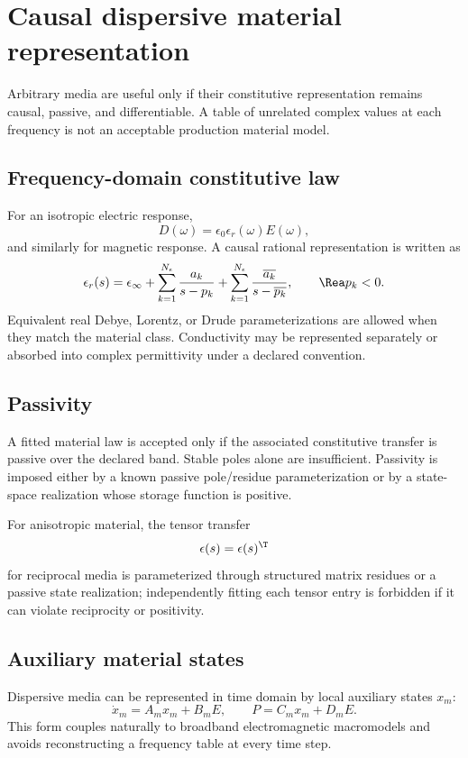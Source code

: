 \section{Causal dispersive material representation}
\label{sec:dispersive-materials}

Arbitrary media are useful only if their constitutive representation remains
causal, passive, and differentiable. A table of unrelated complex values at
each frequency is not an acceptable production material model.

\subsection{Frequency-domain constitutive law}

For an isotropic electric response,
\[
  D(\omega)=\epsilon_0\epsilon_r(\omega)E(\omega),
\]
and similarly for magnetic response. A causal rational representation is
written as
\[
 \epsilon_r(s)
 =
 \epsilon_\infty
 +\sum_{k=1}^{N_\epsilon}
   \frac{a_k}{s-p_k}
 +\sum_{k=1}^{N_\epsilon}
   \frac{\overline{a_k}}{s-\overline{p_k}},
 \qquad \Rea p_k<0 .
\]
Equivalent real Debye, Lorentz, or Drude parameterizations are allowed when they
match the material class. Conductivity may be represented separately or
absorbed into complex permittivity under a declared convention.

\subsection{Passivity}

A fitted material law is accepted only if the associated constitutive transfer
is passive over the declared band. Stable poles alone are insufficient.
Passivity is imposed either by a known passive pole/residue parameterization or
by a state-space realization whose storage function is positive.

For anisotropic material, the tensor transfer
\[
  \epsilon(s)=\epsilon(s)^\T
\]
for reciprocal media is parameterized through structured matrix residues or a
passive state realization; independently fitting each tensor entry is
forbidden if it can violate reciprocity or positivity.

\subsection{Auxiliary material states}

Dispersive media can be represented in time domain by local auxiliary states
$x_m$:
\[
 \dot x_m=A_m x_m+B_m E,\qquad
 P=C_m x_m+D_m E.
\]
This form couples naturally to broadband electromagnetic macromodels and avoids
reconstructing a frequency table at every time step.

